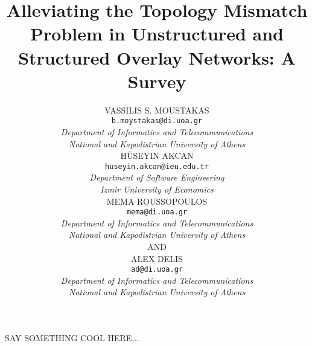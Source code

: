 \documentclass[acmcsur,acmnow]{acmtrans2m}
\title{Alleviating the Topology Mismatch Problem in Unstructured and Structured
Overlay Networks: A Survey}
\author{
VASSILIS S. MOUSTAKAS\\
\texttt{b.moystakas@di.uoa.gr}\\
\emph{Department of Informatics and Telecommunications}\\
\emph{National and Kapodistrian University of Athens}\\
H\"USEYIN AKCAN\\
\texttt{huseyin.akcan@ieu.edu.tr}\\
\emph{Department of Software Engineering}\\
\emph{Izmir University of Economics}\\
MEMA ROUSSOPOULOS\\
\texttt{mema@di.uoa.gr}\\
\emph{Department of Informatics and Telecommunications}\\
\emph{National and Kapodistrian University of Athens}\\
AND\\
ALEX DELIS\\
\texttt{ad@di.uoa.gr}\\
\emph{Department of Informatics and Telecommunications}\\
\emph{National and Kapodistrian University of Athens}
}
\begin{document}
\begin{bottomstuff}
SAY SOMETHING COOL HERE...
\end{bottomstuff}

\maketitle



%
%
%
%
%






%
%
\end{document}
